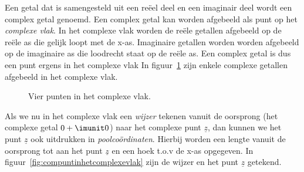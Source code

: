%
%
%

Een getal dat is samengesteld uit een reëel deel en een imaginair deel wordt een complex getal genoemd. Een complex getal kan worden afgebeeld als punt op het \textsl{complexe vlak}. In het complexe vlak worden de reële getallen afgebeeld op de reële as die gelijk loopt met de x-as. Imaginaire getallen worden worden afgebeeld op de imaginaire as die loodrecht staat op de reële as. Een complex getal is dus een punt ergens in het complexe vlak
In figuur~\ref{fig:comvierpunten} zijn enkele complexe getallen afgebeeld in het complexe vlak.

\begin{figure}[!ht]
\centering
{}
\caption{Vier punten in het complexe vlak.}
\label{fig:comvierpunten}
\end{figure}

Als we nu in het complexe vlak een \textsl{wijzer} tekenen vanuit de oorsprong (het complexe getal $0+\imunit0$) naar het complexe punt $\underline{z}$, dan kunnen we het punt $\underline{z}$ ook uitdrukken in \textsl{poolcoördinaten}. Hierbij worden een lengte vanuit de oorsprong tot aan het punt $\underline{z}$ en een hoek t.o.v de x-as opgegeven. In figuur~\ref{fig:compuntinhetcomplexevlak} zijn de wijzer en het punt $\underline{z}$ getekend.

